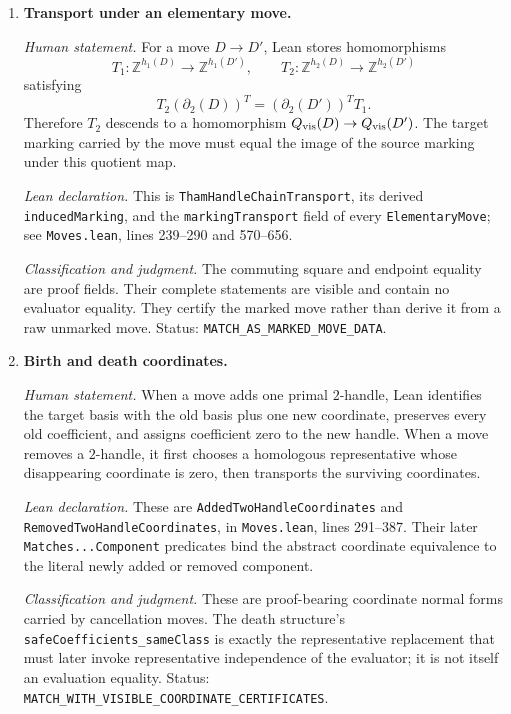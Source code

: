 \begin{enumerate}[label=\textbf{H\arabic*.},leftmargin=*]
\item \textbf{Transport under an elementary move.}

\emph{Human statement.}
For a move $D\to D'$, Lean stores homomorphisms
\[
 T_1\colon\mathbb Z^{h_1(D)}\to\mathbb Z^{h_1(D')},\qquad
 T_2\colon\mathbb Z^{h_2(D)}\to\mathbb Z^{h_2(D')}
\]
satisfying
\[
 T_2(\partial_2(D))^T=(\partial_2(D'))^T T_1.
\]
Therefore $T_2$ descends to a homomorphism
$Q_{\rm vis}(D)\to Q_{\rm vis}(D')$.  The target marking carried by the move
must equal the image of the source marking under this quotient map.

\emph{Lean declaration.}
This is \texttt{ThamHandleChainTransport}, its derived
\texttt{inducedMarking}, and the \texttt{markingTransport} field of every
\texttt{ElementaryMove}; see \nolinkurl{Moves.lean}, lines 239--290 and
570--656.

\emph{Classification and judgment.}
The commuting square and endpoint equality are proof fields.  Their complete
statements are visible and contain no evaluator equality.  They certify the
marked move rather than derive it from a raw unmarked move.  Status:
\nolinkurl{MATCH_AS_MARKED_MOVE_DATA}.

\item \textbf{Birth and death coordinates.}

\emph{Human statement.}
When a move adds one primal $2$-handle, Lean identifies the target basis with
the old basis plus one new coordinate, preserves every old coefficient, and
assigns coefficient zero to the new handle.  When a move removes a
$2$-handle, it first chooses a homologous representative whose disappearing
coordinate is zero, then transports the surviving coordinates.

\emph{Lean declaration.}
These are \nolinkurl{AddedTwoHandleCoordinates} and
\nolinkurl{RemovedTwoHandleCoordinates}, in \nolinkurl{Moves.lean}, lines
291--387.  Their later \nolinkurl{Matches...Component} predicates bind the
abstract coordinate equivalence to the literal newly added or removed
component.

\emph{Classification and judgment.}
These are proof-bearing coordinate normal forms carried by cancellation
moves.  The death structure's \nolinkurl{safeCoefficients_sameClass} is exactly
the representative replacement that must later invoke representative
independence of the evaluator; it is not itself an evaluation equality.
Status: \nolinkurl{MATCH_WITH_VISIBLE_COORDINATE_CERTIFICATES}.

\end{enumerate}

